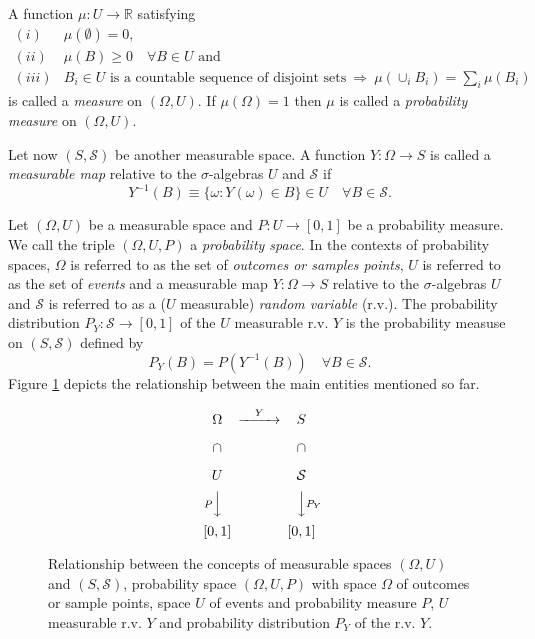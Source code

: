 A function $\mu:U\rightarrow\mathbb{R}$ satisfying
\[
\begin{array}{rl}
  (i) & \mu(\emptyset) = 0, \\
 (ii) & \mu(B)\geqslant 0\quad\forall B\in U\mbox{ and} \\
(iii) & B_i\in U\mbox{ is a countable sequence of disjoint sets}~\Rightarrow~\mu(\cup_iB_i)=\sum_i \mu(B_i)
\end{array}
\]
is called a {\it measure} on $(\Omega,U)$. If $\mu(\Omega)=1$ then $\mu$ is called a {\it probability measure} on $(\Omega,U)$.

Let now $(S,\mathcal{S})$ be another measurable space.
A function $Y:\Omega\rightarrow S$ is called a {\it measurable map} relative to the $\sigma$-algebras $U$ and $\mathcal{S}$ if
\begin{equation*}
Y^{-1}(B)\equiv\{\omega: Y(\omega)\in B\}\in U\quad\forall B\in\mathcal{S}.
\end{equation*}

Let $(\Omega,U)$ be a measurable space and $P:U\rightarrow [0,1]$ be a probability measure.
We call the triple $(\Omega,U,P)$ a {\it probability space}.
In the contexts of probability spaces,
$\Omega$ is referred to as the set of {\it outcomes or samples points},
$U$ is referred to as the set of {\it events} and
a measurable map $Y:\Omega\rightarrow S$ relative to the $\sigma$-algebras $U$ and $\mathcal{S}$ is referred to as a ($U$ measurable) {\it random variable} (r.v.).
The probability distribution $P_Y:\mathcal{S}\rightarrow [0,1]$ of the $U$ measurable r.v. $Y$ is the probability measuse on $(S,\mathcal{S})$ defined by
\begin{equation*}
P_Y(B) = P(Y^{-1}(B))\quad\forall B\in\mathcal{S}.
\end{equation*}
Figure \ref{fig-rv-diagram} depicts the relationship between the main entities mentioned so far.

\begin{figure}[h]
\[
\begin{CD}
\Omega   @>Y>> S           \\
\cap     @.    \cap        \\
U        @.    \mathcal{S} \\
@VP VV         @VVP_Y V    \\
[0,1]    @.    [0,1]
\end{CD}
\]
\caption{Relationship between the concepts of
measurable spaces $(\Omega,U)$ and $(S,\mathcal{S})$,
probability space $(\Omega,U,P)$ with
space $\Omega$ of outcomes or sample points,
space $U$ of events and
probability measure $P$,
$U$ measurable r.v. $Y$ and
probability distribution $P_Y$ of the r.v. $Y$.}
\label{fig-rv-diagram}
\end{figure}

